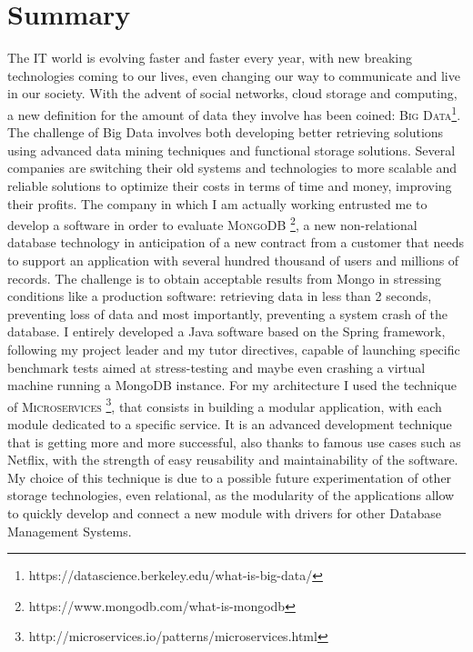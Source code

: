 \chapter*{Summary} %
\label{Summary}


The IT world is evolving faster and faster every year, with new breaking technologies coming to our lives, even changing our way to communicate and live in our society. With the advent of social networks, cloud storage and computing, a new definition for the amount of data they involve has been coined: \textsc{Big Data}\footnote{https://datascience.berkeley.edu/what-is-big-data/}.
The challenge of Big Data involves both developing better retrieving solutions using advanced data mining techniques and functional storage solutions.
Several companies are switching their old systems and technologies to more scalable and reliable solutions to optimize their costs in terms of time and money, improving their profits.
The company in which I am actually working entrusted me to develop a software in order to evaluate \textsc{MongoDB} \footnote{https://www.mongodb.com/what-is-mongodb}, a new non-relational database technology in anticipation of a new  contract from a customer that needs to support an application with several hundred thousand of users and millions of records.
The challenge is to obtain acceptable results from Mongo in stressing conditions like a production software: retrieving data in less than 2 seconds, preventing loss of data and most importantly, preventing a system crash of the database.
I entirely developed a Java software based on the Spring framework, following my project leader and my tutor directives, capable of launching specific benchmark tests aimed at stress-testing and maybe even crashing a virtual machine running a MongoDB instance.
For my architecture I used the technique of \textsc{Microservices} \footnote{http://microservices.io/patterns/microservices.html}, that consists in building a modular application, with each module dedicated to a specific service. It is an advanced development technique that is getting more and more successful, also thanks to famous use cases such as Netflix, with the strength of easy reusability and maintainability of the software.
My choice of this technique is due to a possible future experimentation of other storage technologies, even relational, as the modularity of the applications allow to quickly develop and connect a new module with drivers for other Database Management Systems.
